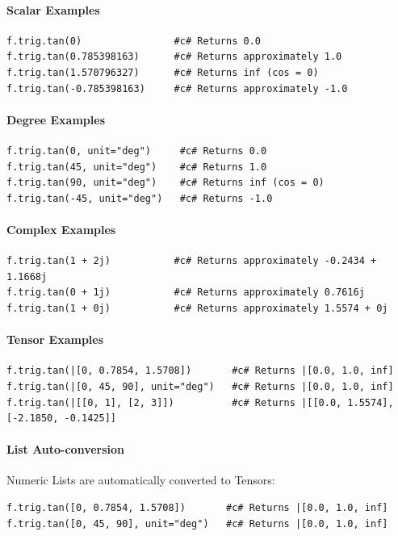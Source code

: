 \paragraph{Scalar Examples}
\begin{verbatim}
f.trig.tan(0)                #c# Returns 0.0
f.trig.tan(0.785398163)      #c# Returns approximately 1.0
f.trig.tan(1.570796327)      #c# Returns inf (cos = 0)
f.trig.tan(-0.785398163)     #c# Returns approximately -1.0
\end{verbatim}

\paragraph{Degree Examples}
\begin{verbatim}
f.trig.tan(0, unit="deg")     #c# Returns 0.0
f.trig.tan(45, unit="deg")    #c# Returns 1.0
f.trig.tan(90, unit="deg")    #c# Returns inf (cos = 0)
f.trig.tan(-45, unit="deg")   #c# Returns -1.0
\end{verbatim}

\paragraph{Complex Examples}
\begin{verbatim}
f.trig.tan(1 + 2j)           #c# Returns approximately -0.2434 + 1.1668j
f.trig.tan(0 + 1j)           #c# Returns approximately 0.7616j
f.trig.tan(1 + 0j)           #c# Returns approximately 1.5574 + 0j
\end{verbatim}

\paragraph{Tensor Examples}
\begin{verbatim}
f.trig.tan(|[0, 0.7854, 1.5708])       #c# Returns |[0.0, 1.0, inf]
f.trig.tan(|[0, 45, 90], unit="deg")   #c# Returns |[0.0, 1.0, inf]
f.trig.tan(|[[0, 1], [2, 3]])          #c# Returns |[[0.0, 1.5574], [-2.1850, -0.1425]]
\end{verbatim}

\paragraph{List Auto-conversion}
Numeric Lists are automatically converted to Tensors:
\begin{verbatim}
f.trig.tan([0, 0.7854, 1.5708])       #c# Returns |[0.0, 1.0, inf]
f.trig.tan([0, 45, 90], unit="deg")   #c# Returns |[0.0, 1.0, inf]
\end{verbatim}

